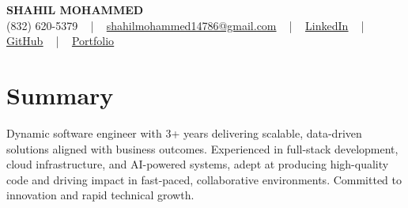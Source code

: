 \documentclass[letterpaper,10pt]{article}
\begin{document}
\begin{center}
    {\fontsize{14pt}{12pt}\selectfont \textbf{\MakeUppercase{Shahil Mohammed}}}\\ \vspace{2pt}
    \fontsize{10pt}{12pt}\selectfont (832) 620-5379 ~ | ~ \href{mailto:shahilmohammed14786@gmail.com}{shahilmohammed14786@gmail.com} ~ | ~  
    \href{https://www.linkedin.com/in/shahil-mohammed-9652931a1/}{\color{blue}\underline{LinkedIn}}  ~ | ~ 
    \href{https://github.com/freakbeast14}{\color{blue}\underline{GitHub}} ~ | ~ 
    \href{https://shahil-mohammed.netlify.app/}{\color{blue}\underline{Portfolio}}
    \vspace{-8pt}
\end{center}

\section{Summary}
\vspace{-2pt}\fontsize{8pt}{9pt}\selectfont
Dynamic software engineer with 3+ years delivering scalable, data-driven solutions aligned with business outcomes. Experienced in full-stack development, cloud infrastructure, and AI-powered systems, adept at producing high-quality code and driving impact in fast-paced, collaborative environments. Committed to innovation and rapid technical growth.
 \vspace{-5pt}
 
\vspace{-2pt}
\end{document}
